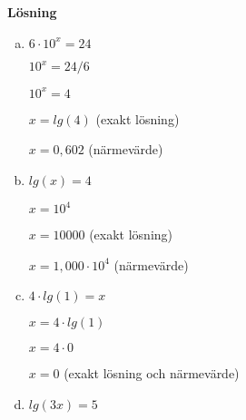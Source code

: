 \documentclass{article}
\begin{document}
\textbf{Lösning}

\begin{enumerate}[(a)]
\item $ 6 \cdot 10^x = 24 $

$ 10^x = 24 / 6 $

$ 10^x = 4 $

$ x = lg(4) $	\tab(exakt lösning)

$ x = 0,602 $	\tab(närmevärde)

\item $ lg(x) = 4 $

$ x = 10^4 $

$ x = 10000 $	\tab(exakt lösning)

$ x = 1,000 \cdot 10^4 $	\tab(närmevärde)

\item $ 4 \cdot lg(1) = x $

$ x = 4 \cdot lg(1) $

$ x = 4 \cdot 0 $

$ x = 0 $	\tab(exakt lösning och närmevärde)

\item $ lg(3x) = 5 $
\end{enumerate}
\end{document}
